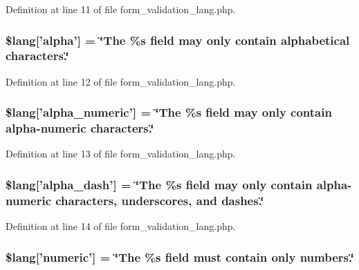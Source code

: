 Definition at line 11 of file form\-\_\-validation\-\_\-lang.\-php.

\subsubsection[{\$lang}]{\setlength{\rightskip}{0pt plus 5cm}\$lang['{\bf alpha}'] = \char`\"{}The \%{\bf s} field may only contain alphabetical characters.\char`\"{}}\label{form__validation__lang_8php_aa49612ba8d03053d7d0b71cceb076758}


Definition at line 12 of file form\-\_\-validation\-\_\-lang.\-php.

\subsubsection[{\$lang}]{\setlength{\rightskip}{0pt plus 5cm}\$lang['alpha\-\_\-numeric'] = \char`\"{}The \%{\bf s} field may only contain {\bf alpha}-\/numeric characters.\char`\"{}}\label{form__validation__lang_8php_a65ae3b2624bdea4b04ab5cf4a508f64e}


Definition at line 13 of file form\-\_\-validation\-\_\-lang.\-php.

\subsubsection[{\$lang}]{\setlength{\rightskip}{0pt plus 5cm}\$lang['alpha\-\_\-dash'] = \char`\"{}The \%{\bf s} field may only contain {\bf alpha}-\/numeric characters, underscores, {\bf and} dashes.\char`\"{}}\label{form__validation__lang_8php_aee9bc9f895ccbca30d1f6433b48a509d}


Definition at line 14 of file form\-\_\-validation\-\_\-lang.\-php.

\subsubsection[{\$lang}]{\setlength{\rightskip}{0pt plus 5cm}\$lang['numeric'] = \char`\"{}The \%{\bf s} field must contain only numbers.\char`\"{}}\label{form__validation__lang_8php_a21d76ebd4b70690a642c86afb93e3cc2}


